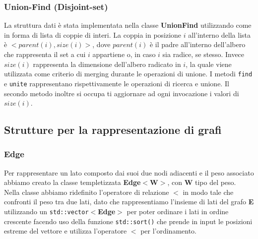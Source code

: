 \documentclass[]{article}
\begin{document}
\subsubsection{Union-Find (Disjoint-set)}
La struttura dati è stata implementata nella classe \textbf{UnionFind} utilizzando come in forma di lista di coppie di interi. La coppia in posizione $i$ all'interno della lista è $<parent(i), size(i)>$, dove $parent(i)$ è il padre all'interno dell'albero che rappresenta il set a cui $i$ appartiene o, in caso $i$ sia radice, se stesso. Invece $size(i)$ rappresenta la dimensione dell'albero radicato in $i$, la quale viene utilizzata come criterio di merging durante le operazioni di unione. I metodi \verb|find| e \verb|unite| rappresentano rispettivamente le operazioni di ricerca e unione. Il secondo metodo inoltre si occupa ti aggiornare ad ogni invocazione i valori di $size(i)$.
\subsection{Strutture per la rappresentazione di grafi}
\subsubsection{Edge}
Per rappresentare un lato composto dai  suoi due nodi adiacenti e il peso associato abbiamo creato la classe templetizzata \textbf{Edge$<$W$>$}, con
\textbf{W} tipo del peso.\\
Nella classe abbiamo ridefinito l'operatore di relazione \textbf{$<$} in modo tale che confronti il peso tra due lati, dato che rappresentiamo l'insieme di lati del grafo \textbf{E} utilizzando un \verb|std::vector|$<$\textbf{Edge}$>$ per poter ordinare i lati in ordine crescente facendo uso della funzione \verb|std::sort()| che prende in input le posizioni estreme del vettore e utilizza l'operatore \textbf{$<$} per l'ordinamento.
\end{document}
